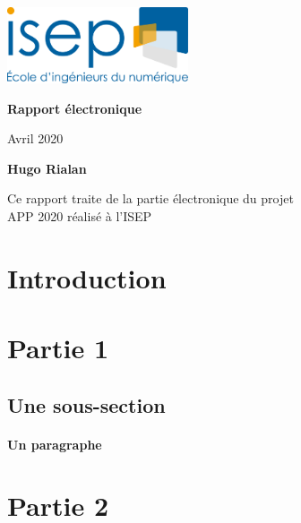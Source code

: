 \documentclass[11pt, oneside]{article}
\begin{document}
\begin{titlepage}
 \includegraphics[width=0.4\textwidth]{./images/logo_isep.png}
 
    \begin{center}
       \vspace{4cm}        
        \Huge
        \textbf{Rapport électronique}
        
        \vspace{2cm}
        \LARGE    
        Avril 2020
            
        \vspace{0.5cm}          
        \textbf{Hugo Rialan}
            
        \vfill
            
        Ce rapport traite de la partie électronique du projet\\
        APP 2020 réalisé à l'ISEP
            
        \vspace{2cm}            
       
    \end{center}
\end{titlepage}

\vspace*{2cm}
\renewcommand{\contentsname}{Sommaire}
\tableofcontents
\newpage

\section{Introduction}

\section{Partie 1}
\subsection{Une sous-section}
\paragraph{Un paragraphe}

\section{Partie 2}
\end{document}

